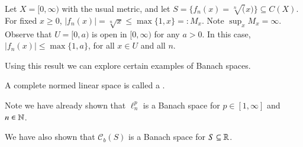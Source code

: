 \begin{eg}
    Let $X = [0,\infty)$ with the usual metric, and let $S = \{f_n(x)=\sqrt[n](x)\}\subseteq C(X)$.  For fixed $x \geq 0$, $|f_n(x)| = \sqrt[n]{x} \leq \max\{1,x\} =: M_x$. Note $\sup_xM_x = \infty$. Observe that $U = [0,a)$ is open in $[0,\infty)$ for any $a > 0$. In this case, $|f_n(x)| \leq \max\{1,a\}$, for all $x \in U$ and all $n$.
\end{eg}

Using this result we can explore certain examples of Banach spaces.

\begin{defn}
    A complete normed linear space is called a .
\end{defn}

\begin{eg}
    Note we have already shown that $\ell_n^p$ is a Banach space for $p \in [1,\infty]$ and $n \in \mathbb N$. 
\end{eg}

\begin{eg}
    We have also shown that $\mathcal{C}_b(S)$ is a Banach space for $S \subseteq \mathbb R$.
\end{eg}

